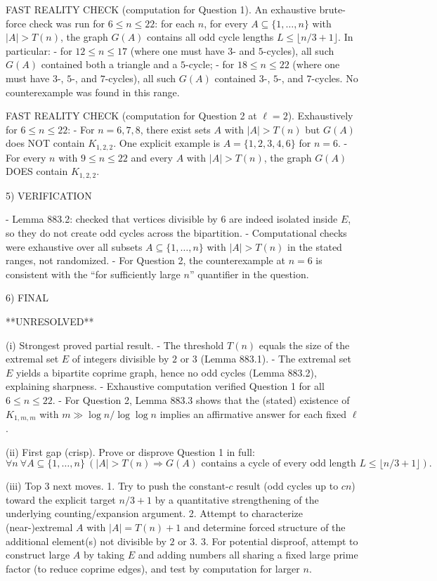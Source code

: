 FAST REALITY CHECK (computation for Question 1).
An exhaustive brute-force check was run for $6\le n\le 22$:
for each $n$, for every $A\subseteq\{1,\dots,n\}$ with $|A|>T(n)$, the graph $G(A)$ contains all odd cycle lengths $L\le \lfloor n/3+1\rfloor$.
In particular:
- for $12\le n\le 17$ (where one must have $3$- and $5$-cycles), all such $G(A)$ contained both a triangle and a $5$-cycle;
- for $18\le n\le 22$ (where one must have $3$-, $5$-, and $7$-cycles), all such $G(A)$ contained $3$-, $5$-, and $7$-cycles.
No counterexample was found in this range.

FAST REALITY CHECK (computation for Question 2 at $\ell=2$).
Exhaustively for $6\le n\le 22$:
- For $n=6,7,8$, there exist sets $A$ with $|A|>T(n)$ but $G(A)$ does NOT contain $K_{1,2,2}$. One explicit example is $A=\{1,2,3,4,6\}$ for $n=6$.
- For every $n$ with $9\le n\le 22$ and every $A$ with $|A|>T(n)$, the graph $G(A)$ DOES contain $K_{1,2,2}$.

5) VERIFICATION

- Lemma 883.2: checked that vertices divisible by $6$ are indeed isolated inside $E$, so they do not create odd cycles across the bipartition.
- Computational checks were exhaustive over all subsets $A\subseteq\{1,\dots,n\}$ with $|A|>T(n)$ in the stated ranges, not randomized.
- For Question 2, the counterexample at $n=6$ is consistent with the “for sufficiently large $n$” quantifier in the question.

6) FINAL

**UNRESOLVED**

(i) Strongest proved partial result.
- The threshold $T(n)$ equals the size of the extremal set $E$ of integers divisible by $2$ or $3$ (Lemma 883.1).
- The extremal set $E$ yields a bipartite coprime graph, hence no odd cycles (Lemma 883.2), explaining sharpness.
- Exhaustive computation verified Question 1 for all $6\le n\le 22$.
- For Question 2, Lemma 883.3 shows that the (stated) existence of $K_{1,m,m}$ with $m\gg \log n/\log\log n$ implies an affirmative answer for each fixed $\ell$.

(ii) First gap (crisp).
Prove or disprove Question 1 in full:
\[\forall n\ \forall A\subseteq\{1,\dots,n\}\ (|A|>T(n)\Rightarrow G(A)\text{ contains a cycle of every odd length }L\le \lfloor n/3+1\rfloor).\]

(iii) Top 3 next moves.
1. Try to push the constant-$c$ result (odd cycles up to $c n$) toward the explicit target $n/3+1$ by a quantitative strengthening of the underlying counting/expansion argument.
2. Attempt to characterize (near-)extremal $A$ with $|A|=T(n)+1$ and determine forced structure of the additional element(s) not divisible by $2$ or $3$.
3. For potential disproof, attempt to construct large $A$ by taking $E$ and adding numbers all sharing a fixed large prime factor (to reduce coprime edges), and test by computation for larger $n$.

